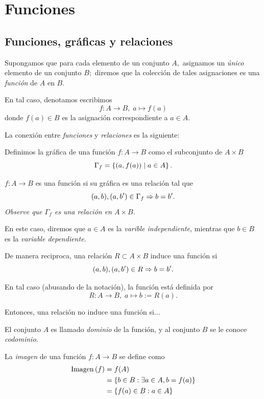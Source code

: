 \section{Funciones}

\subsection{Funciones, gráficas y relaciones}

Supongamos que para cada elemento de un conjunto $A,$ asignamos un \emph{único} elemento de un conjunto $B;$ diremos que la colección de tales asignaciones es una \emph{función} de $A$ en $B.$ 


En tal caso, denotamos escribimos 
$$f:A\to B, \; a \mapsto f(a)$$
donde $f(a)\in B$ es la asignación correspondiente a $a\in A.$



La conexión entre \emph{funciones} y \emph{relaciones} es la siguiente:


Definimos la gráfica de una función $f:A\to B$ como el subconjunto de $A \times B$
$$
\Gamma_{f}=\left\{ (a, f(a)) \mid a \in A \right\}.
$$


 $f:A\to B$ es una función si su gráfica es una relación tal que $$(a,b), (a,b')\in \Gamma_{f} \Rightarrow b=b'.$$  
\emph{Observe que $\Gamma_{f}$ es una relación en $A\times B.$}

En este caso, diremos que $a\in A$ es la \emph{varible independiente,} mientras que $b\in B$ es la \emph{variable dependiente.}



De manera reciproca, una relación $R\subset A \times B$ induce una función si 
$$
(a,b), (a,b')\in R \Rightarrow b=b'.
$$


En tal caso (abusando de la notación), la función está definida por 
$$
R:A\to B, \; a \mapsto b:=R(a).
$$



Entonces, una relación no induce una función si...


El conjunto $A$ es llamado \emph{dominio} de la función, y al conjunto $B$ se le conoce \emph{codominio.}


La \emph{imagen} de una función $f:A\to B$ se define como
\begin{align*}
	\operatorname{Imagen}\left( f \right)&=f(A)\\
	&=\left\{ b \in B : \exists a \in A, b=f(a) \right\}\\
	&=\left\{ f(a)\in B : a \in A \right\}
\end{align*}

